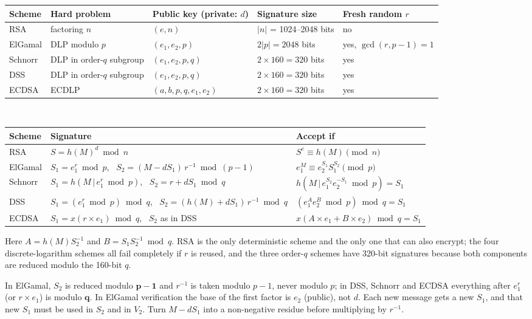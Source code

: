\begin{center}\small
\begin{tabular}{@{}lllll@{}}
\toprule
Scheme & Hard problem & Public key (private: $d$) & Signature size & Fresh random $r$\\
\midrule
RSA & factoring $n$ & $(e, n)$ & $|n|$ = 1024--2048 bits & no\\
ElGamal & DLP modulo $p$ & $(e_1, e_2, p)$ & $2|p| = 2048$ bits & yes, $\gcd(r, p - 1) = 1$\\
Schnorr & DLP in order-$q$ subgroup & $(e_1, e_2, p, q)$ & $2 \times 160 = 320$ bits & yes\\
DSS & DLP in order-$q$ subgroup & $(e_1, e_2, p, q)$ & $2 \times 160 = 320$ bits & yes\\
ECDSA & ECDLP & $(a, b, p, q, e_1, e_2)$ & $2 \times 160 = 320$ bits & yes\\
\bottomrule
\end{tabular}
\\[6pt]
\begin{tabular}{@{}lll@{}}
\toprule
Scheme & Signature & Accept if\\
\midrule
RSA & $S = h(M)^d \bmod n$ & $S^e \equiv h(M) \pmod n$\\
ElGamal & $S_1 = e_1^r \bmod p$, \ $S_2 = (M - dS_1)\,r^{-1} \bmod (p - 1)$ & $e_1^M \equiv e_2^{S_1} S_1^{S_2} \pmod p$\\
Schnorr & $S_1 = h(M \,|\, e_1^r \bmod p)$, \ $S_2 = r + dS_1 \bmod q$ & $h(M \,|\, e_1^{S_2} e_2^{-S_1} \bmod p) = S_1$\\
DSS & $S_1 = (e_1^r \bmod p) \bmod q$, \ $S_2 = (h(M) + dS_1)\,r^{-1} \bmod q$ & $(e_1^A e_2^B \bmod p) \bmod q = S_1$\\
ECDSA & $S_1 = x(r \times e_1) \bmod q$, \ $S_2$ as in DSS & $x(A \times e_1 + B \times e_2) \bmod q = S_1$\\
\bottomrule
\end{tabular}
\end{center}
Here $A = h(M) S_2^{-1}$ and $B = S_1 S_2^{-1} \bmod q$. RSA is the only deterministic scheme and the only one that can also encrypt; the four discrete-logarithm schemes all fail completely if $r$ is reused, and the three order-$q$ schemes have 320-bit signatures because both components are reduced modulo the 160-bit $q$.

\begin{trap}
In ElGamal, $S_2$ is reduced modulo $\boldsymbol{p - 1}$ and $r^{-1}$ is taken modulo $p - 1$, never modulo $p$; in DSS, Schnorr and ECDSA everything after $e_1^r$ (or $r \times e_1$) is modulo $\boldsymbol{q}$. In ElGamal verification the base of the first factor is $e_2$ (public), not $d$. Each new message gets a new $S_1$, and that new $S_1$ must be used in $S_2$ and in $V_2$. Turn $M - dS_1$ into a non-negative residue before multiplying by $r^{-1}$.
\end{trap}


